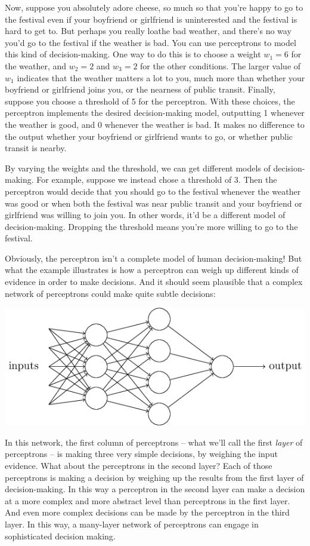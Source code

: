 \documentclass[a4paper,twoside,10pt]{book}
\begin{document}
Now, suppose you absolutely adore cheese, so much so that you're happy to go to the festival even if your boyfriend or girlfriend is uninterested and the festival is hard to get to. But perhaps you really loathe bad weather, and there's no way you'd go to the festival if the weather is bad. You can use perceptrons to model this kind of decision-making. One way to do this is to choose a weight $w_1=6$ for the weather, and $w_2=2$ and $w_3=2$ for the other conditions. The larger value of $w_1$ indicates that the weather matters a lot to you, much more than whether your boyfriend or girlfriend joins you, or the nearness of public transit. Finally, suppose you choose a threshold of 5 for the perceptron. With these choices, the perceptron implements the desired decision-making model, outputting 1 whenever the weather is good, and 0 whenever the weather is bad. It makes no difference to the output whether your boyfriend or girlfriend wants to go, or whether public transit is nearby.

By varying the weights and the threshold, we can get different models of decision-making. For example, suppose we instead chose a threshold of 3. Then the perceptron would decide that you should go to the festival whenever the weather was good or when both the festival was near public transit and your boyfriend or girlfriend was willing to join you. In other words, it'd be a different model of decision-making. Dropping the threshold means you're more willing to go to the festival.

Obviously, the perceptron isn't a complete model of human decision-making! But what the example illustrates is how a perceptron can weigh up different kinds of evidence in order to make decisions. And it should seem plausible that a complex network of perceptrons could make quite subtle decisions:
\begin{center}
	\includegraphics[scale=0.5]{./figures/ch1/tikz1}
\end{center}	
In this network, the first column of perceptrons -- what we'll call the first \textit{layer} of perceptrons -- is making three very simple decisions, by weighing the input evidence. What about the perceptrons in the second layer? Each of those perceptrons is making a decision by weighing up the results from the first layer of decision-making. In this way a perceptron in the second layer can make a decision at a more complex and more abstract level than perceptrons in the first layer. And even more complex decisions can be made by the perceptron in the third layer. In this way, a many-layer network of perceptrons can engage in sophisticated decision making.
\end{document}
